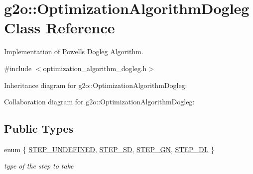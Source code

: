 \hypertarget{classg2o_1_1OptimizationAlgorithmDogleg}{}\section{g2o\+:\+:Optimization\+Algorithm\+Dogleg Class Reference}
\label{classg2o_1_1OptimizationAlgorithmDogleg}


Implementation of Powell\textquotesingle{}s Dogleg Algorithm.  




{\ttfamily \#include $<$optimization\+\_\+algorithm\+\_\+dogleg.\+h$>$}



Inheritance diagram for g2o\+:\+:Optimization\+Algorithm\+Dogleg\+:


Collaboration diagram for g2o\+:\+:Optimization\+Algorithm\+Dogleg\+:
\subsection*{Public Types}
\begin{DoxyCompactItemize}
\item 
enum \{ \hyperlink{classg2o_1_1OptimizationAlgorithmDogleg_ae4f6faede88712ebaee01baf8cf20505ae098265840915f1d6877b4e27fbec1d8}{S\+T\+E\+P\+\_\+\+U\+N\+D\+E\+F\+I\+N\+ED}, 
\hyperlink{classg2o_1_1OptimizationAlgorithmDogleg_ae4f6faede88712ebaee01baf8cf20505a02cb99985ea3c35b57591e6c55f5e037}{S\+T\+E\+P\+\_\+\+SD}, 
\hyperlink{classg2o_1_1OptimizationAlgorithmDogleg_ae4f6faede88712ebaee01baf8cf20505a27f521fdfb791c330af5e59dd989507d}{S\+T\+E\+P\+\_\+\+GN}, 
\hyperlink{classg2o_1_1OptimizationAlgorithmDogleg_ae4f6faede88712ebaee01baf8cf20505a1bc0276b59002bc8892ea9fc39348d1d}{S\+T\+E\+P\+\_\+\+DL}
 \}\begin{DoxyCompactList}\small\item\em type of the step to take \end{DoxyCompactList}
\end{DoxyCompactItemize}
